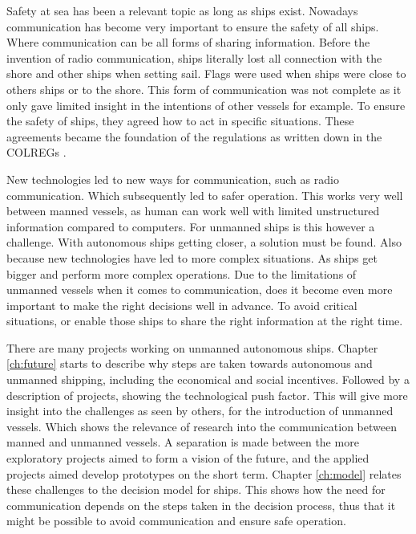 Safety at sea has been a relevant topic as long as ships exist. Nowadays communication has become very important to ensure the safety of all ships. Where communication can be all forms of sharing information. Before the invention of radio communication, ships literally lost all connection with the shore and other ships when setting sail. Flags were used when ships were close to others ships or to the shore. This form of communication was not complete as it only gave limited insight in the intentions of other vessels for example. To ensure the safety of ships, they agreed how to act in specific situations. These agreements became the foundation of the regulations as written down in the \acf{COLREGs} \cite{IMO1972}.

New technologies led to new ways for communication, such as radio communication. Which subsequently led to safer operation. This works very well between manned vessels, as human can work well with limited unstructured information compared to computers. For unmanned ships is this however a challenge. With autonomous ships getting closer, a solution must be found. Also because new technologies have led to more complex situations. As ships get bigger and perform more complex operations. Due to the limitations of unmanned vessels when it comes to communication, does it become even more important to make the right decisions well in advance. To avoid critical situations, or enable those ships to share the right information at the right time.

There are many projects working on unmanned autonomous ships. Chapter \ref{ch:future} starts to describe why steps are taken towards autonomous and unmanned shipping, including the economical and social incentives. Followed by a description of projects, showing the technological push factor. This will give more insight into the challenges as seen by others, for the introduction of unmanned vessels. Which shows the relevance of research into the communication between manned and unmanned vessels. A separation is made between the more exploratory projects aimed to form a vision of the future, and the applied projects aimed develop prototypes on the short term.
Chapter \ref{ch:model} relates these challenges to the decision model for ships. This shows how the need for communication depends on the steps taken in the decision process, thus that it might be possible to avoid communication and ensure safe operation.